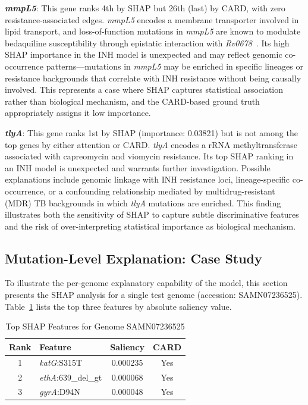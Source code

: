 \documentclass[conference]{IEEEtran}
\begin{document}
\textbf{\textit{mmpL5}}: This gene ranks 4th by SHAP but 26th (last) by CARD, with zero resistance-associated edges. \textit{mmpL5} encodes a membrane transporter involved in lipid transport, and loss-of-function mutations in \textit{mmpL5} are known to modulate bedaquiline susceptibility through epistatic interaction with \textit{Rv0678}~\cite{ref_mmpl5}. Its high SHAP importance in the INH model is unexpected and may reflect genomic co-occurrence patterns---mutations in \textit{mmpL5} may be enriched in specific lineages or resistance backgrounds that correlate with INH resistance without being causally involved. This represents a case where SHAP captures statistical association rather than biological mechanism, and the CARD-based ground truth appropriately assigns it low importance.

\textbf{\textit{tlyA}}: This gene ranks 1st by SHAP (importance: 0.03821) but is not among the top genes by either attention or CARD. \textit{tlyA} encodes a rRNA methyltransferase associated with capreomycin and viomycin resistance. Its top SHAP ranking in an INH model is unexpected and warrants further investigation. Possible explanations include genomic linkage with INH resistance loci, lineage-specific co-occurrence, or a confounding relationship mediated by multidrug-resistant (MDR) TB backgrounds in which \textit{tlyA} mutations are enriched. This finding illustrates both the sensitivity of SHAP to capture subtle discriminative features and the risk of over-interpreting statistical importance as biological mechanism.

\subsection{Mutation-Level Explanation: Case Study}

To illustrate the per-genome explanatory capability of the model, this section presents the SHAP analysis for a single test genome (accession: SAMN07236525). Table~\ref{tab:shap_example} lists the top three features by absolute saliency value.

\begin{table}[t]
\centering
\caption{Top SHAP Features for Genome SAMN07236525}
\label{tab:shap_example}
\begin{tabular}{clcc}
\toprule
\textbf{Rank} & \textbf{Feature} & \textbf{Saliency} & \textbf{CARD} \\
\midrule
1 & \textit{katG}:S315T       & 0.000235 & Yes \\
2 & \textit{ethA}:639\_del\_gt & 0.000068 & Yes \\
3 & \textit{gyrA}:D94N        & 0.000048 & Yes \\
\bottomrule
\end{tabular}
\end{table}
\end{document}
